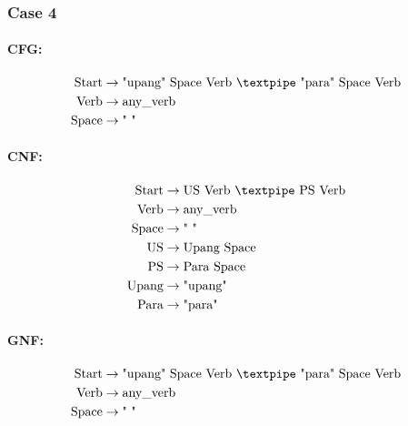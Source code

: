 \subsubsection{Case 4}

\paragraph{CFG:}

\begin{equation*}
    \begin{aligned}
        \text{Start} & \rightarrow \text{"upang" Space Verb {\textpipe} "para" Space Verb} \\
        \text{Verb}  & \rightarrow \text{any\_verb}                                        \\
        \text{Space} & \rightarrow \text{" "}
    \end{aligned}
\end{equation*}

\paragraph{CNF:}

\begin{equation*}
    \begin{aligned}
        \text{Start} & \rightarrow \text{US Verb {\textpipe} PS Verb} \\
        \text{Verb}  & \rightarrow \text{any\_verb}                   \\
        \text{Space} & \rightarrow \text{" "}                         \\
        \text{US}    & \rightarrow \text{Upang Space}                 \\
        \text{PS}    & \rightarrow \text{Para Space}                  \\
        \text{Upang} & \rightarrow \text{"upang"}                     \\
        \text{Para}  & \rightarrow \text{"para"}
    \end{aligned}
\end{equation*}

\paragraph{GNF:}

\begin{equation*}
    \begin{aligned}
        \text{Start} & \rightarrow \text{"upang" Space Verb {\textpipe} "para" Space Verb} \\
        \text{Verb}  & \rightarrow \text{any\_verb}                                        \\
        \text{Space} & \rightarrow \text{" "}
    \end{aligned}
\end{equation*}


